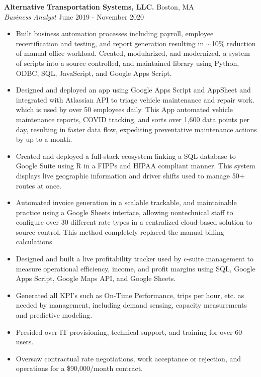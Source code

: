\documentclass[a4paper]{article}
\begin{document}
\textbf{Alternative Transportation Systems, LLC.} \hfill Boston, MA\\
\textit{Business Analyst} \hfill June 2019 - November 2020\\
\vspace{-1mm}
\begin{itemize} \itemsep 1pt
	\item Built business automation processes including payroll, employee recertification and testing, and report generation resulting in $\sim$10\% reduction of manual office workload. 
    Created, modularized, and modernized, a system of scripts into a source controlled, and maintained library using Python, ODBC, SQL, JavaScript, and Google Apps Script.
	\item Designed and deployed an app using Google Apps Script and AppSheet and integrated with Atlassian API to triage vehicle maintenance and repair work. which is used by over 50 employees daily. This App automated vehicle maintenance reports, COVID tracking, and sorts over 1,600 data points per day, resulting in faster data flow, expediting preventative maintenance actions by up to a month.
	\item Created and deployed a full-stack ecosystem linking a SQL database to Google Suite using R in a FIPPs and HIPAA compliant manner. This system displays live geographic information and driver shifts used to manage 50+ routes at once.
	\item Automated invoice generation in a scalable trackable, and maintainable practice using a Google Sheets interface, allowing nontechnical staff to configure over 30 different rate types in a centralized cloud-based solution to source control. This method completely replaced the manual billing calculations.
	\item Designed and built a live profitability tracker used by c-suite management to measure operational efficiency, income, and profit margins using SQL, Google Apps Script, Google Maps API, and Google Sheets.
	\item Generated all KPI’s such as On-Time Performance, trips per hour, etc. as needed by management, including demand sensing, capacity measurements and predictive modeling.
	\item Presided over IT provisioning, technical support, and training for over 60 users.
	\item Oversaw contractual rate negotiations, work acceptance or rejection, and operations for a \$90,000/month contract.
\end{itemize}
\end{document}
